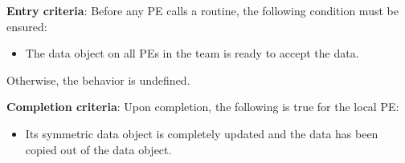 \begin{apidefinition}
{    {\bf Entry criteria}: Before any \ac{PE} calls a  routine,
    the following condition must be ensured:
    \begin{itemize}
    \item The  data object on all \acp{PE} in the team is
      ready to accept the  data.
    \end{itemize}
    Otherwise, the behavior is undefined.

    {\bf Completion criteria}: Upon completion, the following is true for
    the local PE:
    \begin{itemize}
    \item Its  symmetric data object is completely updated and
    the data has been copied out of the  data object.
    \end{itemize}
}


\end{apidefinition}

